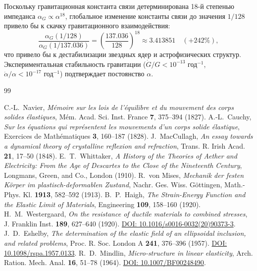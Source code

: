 \documentclass[11pt,a4paper]{article}
\theoremstyle{definition}
\theoremstyle{remark}
\begin{document}
Поскольку гравитационная константа связи детерминирована 18-й степенью импеданса $\alpha_G \propto \alpha^{18}$, глобальное изменение константы связи до значения $1/128$ привело бы к скачку гравитационного взаимодействия:
\begin{equation}
	\frac{\alpha_G(1/128)}{\alpha_G(1/137.036)} = \left(\frac{137.036}{128}\right)^{18} \approx 3.413851 \quad (+242\%),
	\label{eq:renorm_jump_catastrophe}
\end{equation}
что привело бы к дестабилизации звездных ядер и астрофизических структур. Экспериментальная стабильность гравитации ($\dot{G}/G < 10^{-13}\text{ год}^{-1}$, $\dot{\alpha}/\alpha < 10^{-17}\text{ год}^{-1}$) подтверждает постоянство $\alpha$.

\begin{thebibliography}{99}
	
	 C.-L.~Navier, \textit{M{\'e}moire sur les lois de l'{\'e}quilibre et du mouvement des corps solides {\'e}lastiques}, M{\'e}m. Acad. Sci. Inst. France \textbf{7}, 375--394 (1827).
	 A.-L.~Cauchy, \textit{Sur les {\'e}quations qui repr{\'e}sentent les mouvements d'un corps solide {\'e}lastique}, Exercices de Math{\'e}matiques \textbf{3}, 160--187 (1828).
	 J.~MacCullagh, \textit{An essay towards a dynamical theory of crystalline reflexion and refraction}, Trans. R. Irish Acad. \textbf{21}, 17--50 (1848).
	 E.~T.~Whittaker, \textit{A History of the Theories of Aether and Electricity: From the Age of Descartes to the Close of the Nineteenth Century}, Longmans, Green, and Co., London (1910).
	 R.~von Mises, \textit{Mechanik der festen K{\"o}rper im plastisch-deformablen Zustand}, Nachr. Ges. Wiss. G{\"o}ttingen, Math.-Phys. Kl. \textbf{1913}, 582--592 (1913).
	 B.~P.~Haigh, \textit{The Strain-Energy Function and the Elastic Limit of Materials}, Engineering \textbf{109}, 158--160 (1920).
	 H.~M.~Westergaard, \textit{On the resistance of ductile materials to combined stresses}, J. Franklin Inst. \textbf{189}, 627--640 (1920). \href{https://doi.org/10.1016/s0016-0032(20)90373-3}{DOI: 10.1016/s0016-0032(20)90373-3}.
	 J.~D.~Eshelby, \textit{The determination of the elastic field of an ellipsoidal inclusion, and related problems}, Proc. R. Soc. London A \textbf{241}, 376--396 (1957). \href{https://doi.org/10.1098/rspa.1957.0133}{DOI: 10.1098/rspa.1957.0133}.
	 R.~D.~Mindlin, \textit{Micro-structure in linear elasticity}, Arch. Ration. Mech. Anal. \textbf{16}, 51--78 (1964). \href{https://doi.org/10.1007/BF00248490}{DOI: 10.1007/BF00248490}.
	

\end{thebibliography}
\end{document}
